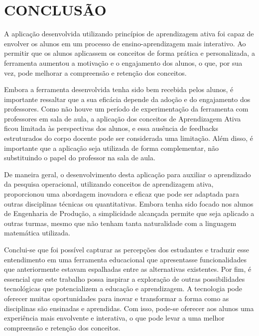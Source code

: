 \documentclass{article}
\begin{document}
\section{CONCLUSÃO}

A aplicação desenvolvida utilizando princípios de aprendizagem ativa foi capaz de envolver os alunos em um processo de ensino-aprendizagem mais interativo. Ao permitir que os alunos aplicassem os conceitos de forma prática e personalizada, a ferramenta aumentou a motivação e o engajamento dos alunos, o que, por sua vez, pode melhorar a compreensão e retenção dos conceitos.

Embora a ferramenta desenvolvida tenha sido bem recebida pelos alunos, é importante ressaltar que a sua eficácia depende da adoção e do engajamento dos professores. Como não houve um período de experimentação da ferramenta com professores em sala de aula, a aplicação dos conceitos de Aprendizagem Ativa ficou limitada às perspectivas dos alunos, e essa ausência de feedbacks estruturados do corpo docente pode ser considerada uma limitação. Além disso, é importante que a aplicação seja utilizada de forma complementar, não substituindo o papel do professor na sala de aula.

De maneira geral, o desenvolvimento desta aplicação para auxiliar o aprendizado da pesquisa operacional, utilizando conceitos de aprendizagem ativa, proporcionou uma abordagem inovadora e eficaz que pode ser adaptada para outras disciplinas técnicas ou quantitativas. Embora tenha sido focado nos alunos de Engenharia de Produção, a simplicidade alcançada permite que seja aplicado a outras turmas, mesmo que não tenham tanta naturalidade com a linguagem matemática utilizada.

Conclui-se que foi possível capturar as percepções dos estudantes e traduzir esse entendimento em uma ferramenta educacional que apresentasse funcionalidades que anteriormente estavam espalhadas entre as alternativas existentes. Por fim, é essencial que este trabalho possa inspirar a exploração de outras possibilidades tecnológicas que potencializem a educação e aprendizagem. A tecnologia pode oferecer muitas oportunidades para inovar e transformar a forma como as disciplinas são ensinadas e aprendidas. Com isso, pode-se oferecer aos alunos uma experiência mais envolvente e interativa, o que pode levar a uma melhor compreensão e retenção dos conceitos.

\renewcommand{\refname}{REFERÊNCIAS}


\end{document}
